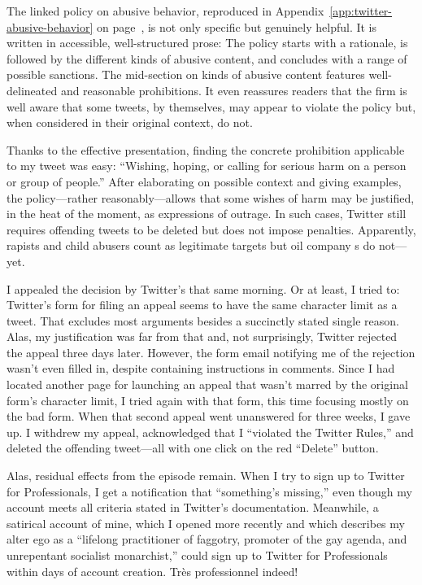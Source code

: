\noindent{}The linked policy on abusive behavior, reproduced in
Appendix~\ref{app:twitter-abusive-behavior} on
page~\pageref{app:twitter-abusive-behavior}, is not only specific but genuinely
helpful. It is written in accessible, well-structured prose: The policy starts
with a rationale, is followed by the different kinds of abusive content, and
concludes with a range of possible sanctions. The mid-section on kinds of
abusive content features well-delineated and reasonable prohibitions. It even
reassures readers that the firm is well aware that some tweets, by themselves,
may appear to violate the policy but, when considered in their original context,
do not.

Thanks to the effective presentation, finding the concrete prohibition
applicable to my tweet was easy: ``Wishing, hoping, or calling for serious harm
on a person or group of people.'' After elaborating on possible context and
giving examples, the policy---rather reasonably---allows that some wishes of
harm may be justified, in the heat of the moment, as expressions of outrage. In
such cases, Twitter still requires offending tweets to be deleted but does not
impose penalties. Apparently, rapists and child abusers count as legitimate
targets but oil company s do not---yet.

I appealed the decision by Twitter's  that same morning. Or at least, I
tried to: Twitter's form for filing an appeal seems to have the same character
limit as a tweet. That excludes most arguments besides a succinctly stated
single reason. Alas, my justification was far from that and, not surprisingly,
Twitter rejected the appeal three days later. However, the form email notifying
me of the rejection wasn't even filled in, despite containing instructions in
 comments. Since I had located another page for launching an appeal that
wasn't marred by the original form's character limit, I tried again with that
form, this time focusing mostly on the bad form. When that second appeal went
unanswered for three weeks, I gave up. I withdrew my appeal, acknowledged that I
``violated the Twitter Rules,'' and deleted the offending tweet---all with one
click on the red ``Delete'' button.

Alas, residual effects from the episode remain. When I try to sign up to Twitter
for Professionals, I get a notification that ``something's missing,'' even
though my account meets all criteria stated in Twitter's documentation.
Meanwhile, a satirical account of mine, which I opened more recently and which
describes my alter ego as a ``lifelong practitioner of faggotry, promoter of the
gay agenda, and unrepentant socialist monarchist,'' could sign up to Twitter for
Professionals within days of account creation. Très professionnel indeed!


